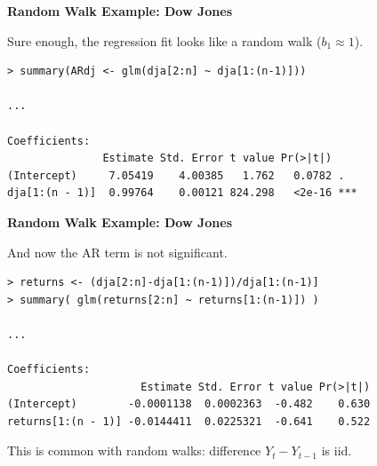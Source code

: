 \documentclass[12pt,xcolor=svgnames]{beamer}
\newcommand{\nv}{\color{Navy}}
\newcommand{\theme}{\color{Maroon}}
\newcommand{\sk}{\vspace{.5cm}}
\begin{document}
\begin{frame}[fragile]

{\bf Random Walk Example: Dow Jones}\sk

\small
Sure enough, the regression fit looks like a random walk ($b_1 \approx 1$).

{\nv\footnotesize

\begin{verbatim}
> summary(ARdj <- glm(dja[2:n] ~ dja[1:(n-1)]))

...

Coefficients:
               Estimate Std. Error t value Pr(>|t|)    
(Intercept)     7.05419    4.00385   1.762   0.0782 .  
dja[1:(n - 1)]  0.99764    0.00121 824.298   <2e-16 ***
\end{verbatim}}


\end{frame}






\begin{frame}[fragile]

{\bf Random Walk Example: Dow Jones}\sk


And now the AR term is not significant.

{\footnotesize\nv
\begin{verbatim}
> returns <- (dja[2:n]-dja[1:(n-1)])/dja[1:(n-1)]
> summary( glm(returns[2:n] ~ returns[1:(n-1)]) )

...

Coefficients:
                     Estimate Std. Error t value Pr(>|t|)
(Intercept)        -0.0001138  0.0002363  -0.482    0.630
returns[1:(n - 1)] -0.0144411  0.0225321  -0.641    0.522
\end{verbatim}}

This is common with random walks: \theme difference  $Y_{t}- Y_{t-1}$ is iid.

\end{frame}
\end{document}
